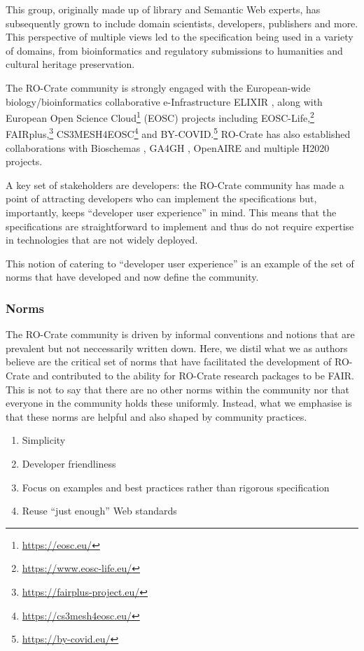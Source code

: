 \documentclass[ds,v1.1.2,openaccess]{iosart2x}%
\begin{document}
This group, originally made up of library and Semantic Web experts, has
subsequently grown to include domain scientists, developers, publishers
and more. This perspective of multiple views led to the specification
being used in a variety of domains, from bioinformatics and regulatory
submissions to humanities and cultural heritage preservation.

The RO-Crate community is strongly engaged with the European-wide
biology/bioinformatics collaborative e-Infrastructure ELIXIR
\cite{doi:10.1016/j.tibtech.2012.02.002}, along with European Open Science
Cloud\footnote{\url{https://eosc.eu/}} (EOSC) projects including
EOSC-Life,\footnote{\url{https://www.eosc-life.eu/}}
FAIRplus,\footnote{\url{https://fairplus-project.eu/}}
CS3MESH4EOSC\footnote{\url{https://cs3mesh4eosc.eu/}} and
BY-COVID.\footnote{\url{https://by-covid.eu/}} RO-Crate has also established
collaborations with Bioschemas \cite{bioschemas_2017}, GA4GH
\cite{doi:10.1016/j.xgen.2021.100029}, OpenAIRE \cite{rettberg_2015_openaire}
and multiple H2020 projects.

A key set of stakeholders are developers: the RO-Crate community has
made a point of attracting developers who can implement the
specifications but, importantly, keeps ``developer user experience'' in
mind. This means that the specifications are straightforward to
implement and thus do not require expertise in technologies that are
not widely deployed.

This notion of catering to ``developer user experience'' is an example
of the set of norms that have developed and now define the community.

\subsubsection{Norms}

The RO-Crate community is driven by informal conventions and notions
that are prevalent but not neccessarily written down. Here, we distil
what we as authors believe are the critical set of norms that have
facilitated the development of RO-Crate and contributed to the ability
for RO-Crate research packages to be FAIR. This is not to say that
there are no other norms within the community nor that everyone in the
community holds these uniformly. Instead, what we emphasise is that
these norms are helpful and also shaped by community practices.
\begin{enumerate}
\item[1.] Simplicity
\item[2.] Developer friendliness
\item[3.] Focus on examples and best practices rather than rigorous specification
\item[4.] Reuse ``just enough'' Web standards
\end{enumerate}
\end{document}
